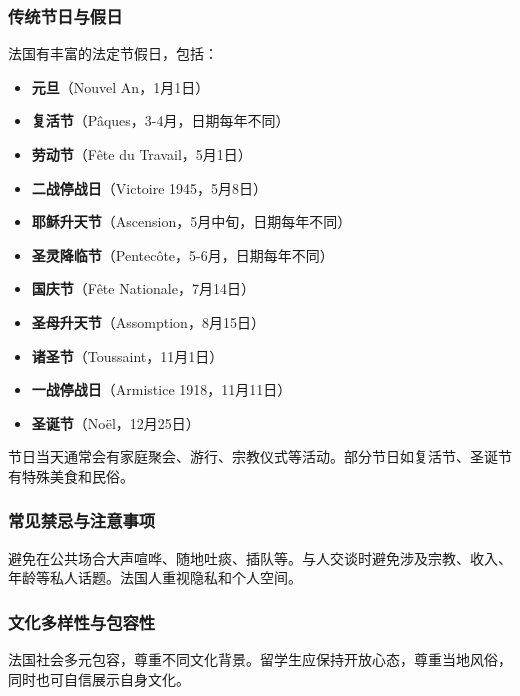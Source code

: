 \subsubsection{传统节日与假日}
法国有丰富的法定节假日，包括：
\begin{itemize}
  \item \textbf{元旦}（Nouvel An，1月1日）
  \item \textbf{复活节}（Pâques，3-4月，日期每年不同）
  \item \textbf{劳动节}（Fête du Travail，5月1日）
  \item \textbf{二战停战日}（Victoire 1945，5月8日）
  \item \textbf{耶稣升天节}（Ascension，5月中旬，日期每年不同）
  \item \textbf{圣灵降临节}（Pentecôte，5-6月，日期每年不同）
  \item \textbf{国庆节}（Fête Nationale，7月14日）
  \item \textbf{圣母升天节}（Assomption，8月15日）
  \item \textbf{诸圣节}（Toussaint，11月1日）
  \item \textbf{一战停战日}（Armistice 1918，11月11日）
  \item \textbf{圣诞节}（Noël，12月25日）
\end{itemize}
节日当天通常会有家庭聚会、游行、宗教仪式等活动。部分节日如复活节、圣诞节有特殊美食和民俗。

\subsubsection{常见禁忌与注意事项}
避免在公共场合大声喧哗、随地吐痰、插队等。与人交谈时避免涉及宗教、收入、年龄等私人话题。法国人重视隐私和个人空间。

\subsubsection{文化多样性与包容性}
法国社会多元包容，尊重不同文化背景。留学生应保持开放心态，尊重当地风俗，同时也可自信展示自身文化。
